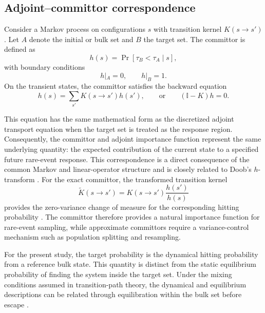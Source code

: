 \documentclass[a4paper,fleqn]{cas-sc}
\let\Oldsubsection\subsection
\renewcommand{\subsection}{\FloatBarrier\Oldsubsection}
\begin{document}
	\subsection{Adjoint--committor correspondence}\label{sec:identity}
	
	Consider a Markov process on configurations $s$ with transition kernel $K(s\rightarrow s')$. Let $A$ denote the initial or bulk set and $B$ the target set. The committor is defined as
	\begin{equation}
		h(s)=\Pr[\tau_B<\tau_A\mid s],
	\end{equation}
	with boundary conditions
	\begin{equation}
		h|_A=0,\qquad h|_B=1.
	\end{equation}
	On the transient states, the committor satisfies the backward equation
	\begin{equation}
		h(s)=\sum_{s'}K(s\rightarrow s')h(s'),
		\qquad\text{or}\qquad
		(\mathbb I-K)h=0 .
		\label{eq:committor}
	\end{equation}
	
	This equation has the same mathematical form as the discretized adjoint transport equation when the target set is treated as the response region. Consequently, the committor and adjoint importance function represent the same underlying quantity: the expected contribution of the current state to a specified future rare-event response. This correspondence is a direct consequence of the common Markov and linear-operator structure and is closely related to Doob's $h$-transform \cite{doob1984}. For the exact committor, the transformed transition kernel
	\begin{equation}
		\widetilde K(s\rightarrow s')
		=K(s\rightarrow s')\frac{h(s')}{h(s)}
	\end{equation}
	provides the zero-variance change of measure for the corresponding hitting probability \cite{chetrite2015,touchette2009}. The committor therefore provides a natural importance function for rare-event sampling, while approximate committors require a variance-control mechanism such as population splitting and resampling.
	
	For the present study, the target probability is the dynamical hitting probability from a reference bulk state. This quantity is distinct from the static equilibrium probability of finding the system inside the target set. Under the mixing conditions assumed in transition-path theory, the dynamical and equilibrium descriptions can be related through equilibration within the bulk set before escape \cite{e2006}.
	
\end{document}
